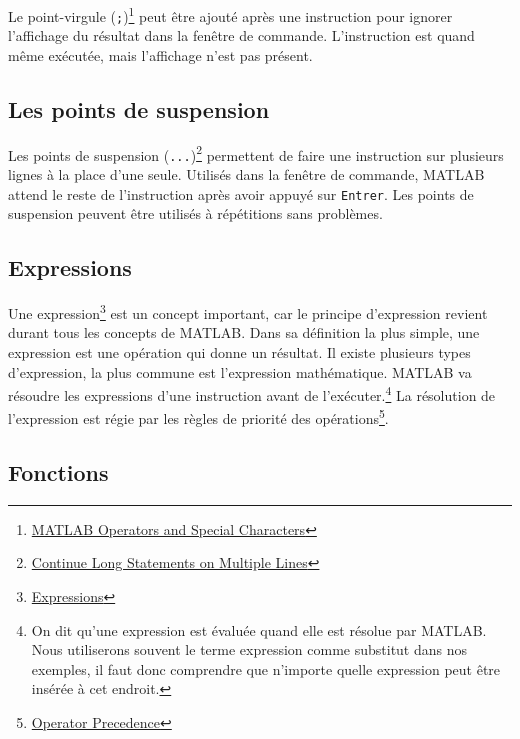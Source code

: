 \documentclass[]{tufte-handout}
\begin{document}
Le point-virgule (\texttt{;})\footnote{\href{https://www.mathworks.com/help/matlab/matlab_prog/matlab-operators-and-special-characters.html}{MATLAB
  Operators and Special Characters}} peut être ajouté après une
instruction pour ignorer l'affichage du résultat dans la fenêtre de
commande. L'instruction est quand même exécutée, mais l'affichage n'est
pas présent.

\hypertarget{les-points-de-suspension}{%
\subsection{Les points de suspension}\label{les-points-de-suspension}}

Les points de suspension (\texttt{...})\footnote{\href{https://www.mathworks.com/help/matlab/matlab_prog/continue-long-statements-on-multiple-lines.html}{Continue
  Long Statements on Multiple Lines}} permettent de faire une
instruction sur plusieurs lignes à la place d'une seule. Utilisés dans
la fenêtre de commande, MATLAB attend le reste de l'instruction après
avoir appuyé sur \texttt{Entrer}. Les points de suspension peuvent être
utilisés à répétitions sans problèmes.

\hypertarget{expressions}{%
\subsection{Expressions}\label{expressions}}

Une expression\footnote{\href{https://www.mathworks.com/help/matlab/learn_matlab/expressions.html}{Expressions}}
est un concept important, car le principe d'expression revient durant
tous les concepts de MATLAB. Dans sa définition la plus simple, une
expression est une opération qui donne un résultat. Il existe plusieurs
types d'expression, la plus commune est l'expression mathématique.
MATLAB va résoudre les expressions d'une instruction avant de
l'exécuter.\footnote{On dit qu'une expression est évaluée quand elle est
  résolue par MATLAB. Nous utiliserons souvent le terme expression comme
  substitut dans nos exemples, il faut donc comprendre que n'importe
  quelle expression peut être insérée à cet endroit.} La résolution de
l'expression est régie par les règles de priorité des
opérations\footnote{\href{https://www.mathworks.com/help/matlab/matlab_prog/operator-precedence.html}{Operator
  Precedence}}.

\hypertarget{fonctions}{%
\subsection{Fonctions}\label{fonctions}}
\end{document}
